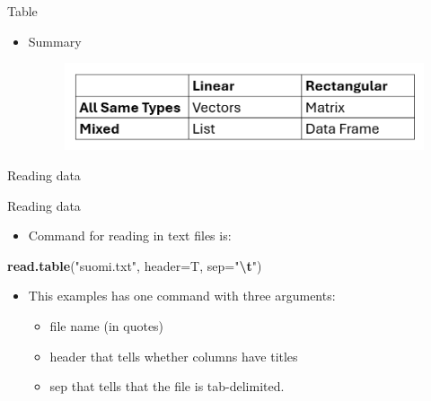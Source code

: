 \documentclass[
  ignorenonframetext,
]{beamer}
\newenvironment{Shaded}{\begin{snugshade}}{\end{snugshade}}
\newcommand{\AttributeTok}[1]{\textcolor[rgb]{0.13,0.29,0.53}{#1}}
\newcommand{\FunctionTok}[1]{\textcolor[rgb]{0.13,0.29,0.53}{\textbf{#1}}}
\newcommand{\NormalTok}[1]{#1}
\newcommand{\SpecialCharTok}[1]{\textcolor[rgb]{0.81,0.36,0.00}{\textbf{#1}}}
\newcommand{\StringTok}[1]{\textcolor[rgb]{0.31,0.60,0.02}{#1}}
\providecommand{\tightlist}{%
  \setlength{\itemsep}{0pt}\setlength{\parskip}{0pt}}
\begin{document}
\begin{frame}{Table}
\label{table}
\begin{itemize}
\tightlist
\item
  Summary

  \begin{figure}
  \includegraphics[width=0.8\linewidth]{fig/table} \end{figure}
\end{itemize}
\end{frame}

\begin{frame}{Reading data}
\label{reading-data}
\end{frame}

\begin{frame}[fragile]{Reading data}
\label{reading-data-1}
\begin{itemize}
\tightlist
\item
  Command for reading in text files is:
\end{itemize}

\begin{Shaded}
\begin{Highlighting}[]
\FunctionTok{read.table}\NormalTok{(}\StringTok{"suomi.txt"}\NormalTok{, }\AttributeTok{header=}\NormalTok{T, }\AttributeTok{sep=}\StringTok{"}\SpecialCharTok{\textbackslash{}t}\StringTok{"}\NormalTok{)}
\end{Highlighting}
\end{Shaded}

\begin{itemize}
\tightlist
\item
  This examples has one command with three arguments:

  \begin{itemize}
  \tightlist
  \item
    file name (in quotes)
  \item
    header that tells whether columns have titles
  \item
    sep that tells that the file is tab-delimited.
  \end{itemize}
\end{itemize}
\end{frame}
\end{document}
